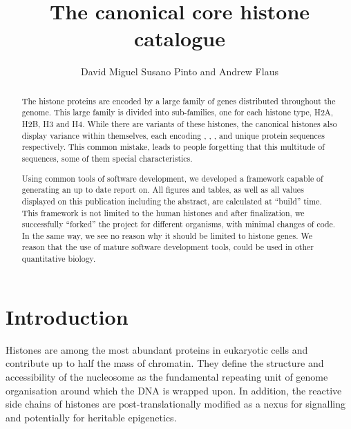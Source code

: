\documentclass[10pt,a4paper,twocolumn,article]{memoir}
\author{David Miguel Susano Pinto and Andrew Flaus}
\title{The canonical core histone catalogue}
\begin{document}
  \maketitle

  \begin{abstract}
    The histone proteins are encoded by a large family of genes distributed throughout the
    genome. This large family is divided into sub-families, one for each histone type, H2A,
    H2B, H3 and H4. While there are variants of these histones, the canonical histones
    also display variance within themselves, each encoding \TotalHTwoA{}, \TotalHTwoB{}, \TotalHThree{},
    and \TotalHFour{} unique protein sequences respectively. This common mistake, leads
    to people forgetting that this multitude of sequences, some of them special characteristics.
    
    Using common tools of software development, we developed a framework capable of generating
    an up to date report on. All figures and tables, as well as all values displayed on
    this publication including the abstract, are calculated at ``build'' time. This framework
    is not limited to the human histones and after finalization, we successfully ``forked'' the
    project for different organisms, with minimal changes of code. In the same way, we see no
    reason why it should be limited to histone genes. We reason that the use of mature software
    development tools, could be used in other quantitative biology.
  \end{abstract}

  \section{Introduction}

    Histones are among the most abundant proteins in eukaryotic cells and contribute up
    to half the mass of chromatin. They define the structure and accessibility of the
    nucleosome as the fundamental repeating unit of genome organisation around which
    the DNA is wrapped upon. In addition, the reactive
    side chains of histones are post-translationally modified as a nexus for signalling
    and potentially for heritable epigenetics.
\end{document}
